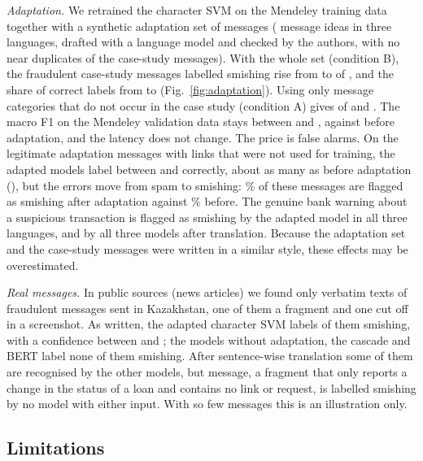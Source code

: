\emph{Adaptation.} We retrained the character SVM on the Mendeley training data together with a synthetic adaptation set of  messages ( message ideas in three languages, drafted with a language model and checked by the authors, with no near duplicates of the case-study messages). With the whole set (condition B), the fraudulent case-study messages labelled smishing rise from  to  of , and the share of correct labels from  to  (Fig.~\ref{fig:adaptation}). Using only message categories that do not occur in the case study (condition A) gives  of  and . The macro F1 on the Mendeley validation data stays between  and , against  before adaptation, and the latency does not change. The price is false alarms. On the legitimate adaptation messages with links that were not used for training, the adapted models label between  and  correctly, about as many as before adaptation (), but the errors move from spam to smishing: \% of these messages are flagged as smishing after adaptation against \% before. The genuine bank warning about a suspicious transaction is flagged as smishing by the adapted model in all three languages, and by all three models after translation. Because the adaptation set and the case-study messages were written in a similar style, these effects may be overestimated.

\emph{Real messages.} In public sources (news articles) we found only  verbatim texts of fraudulent messages sent in Kazakhstan, one of them a fragment and one cut off in a screenshot. As written, the adapted character SVM labels  of them smishing, with a confidence between  and ; the models without adaptation, the cascade and BERT label none of them smishing. After sentence-wise translation some of them are recognised by the other models, but  message, a fragment that only reports a change in the status of a loan and contains no link or request, is labelled smishing by no model with either input. With so few messages this is an illustration only.

\subsection{Limitations}\label{sec:limitations}

